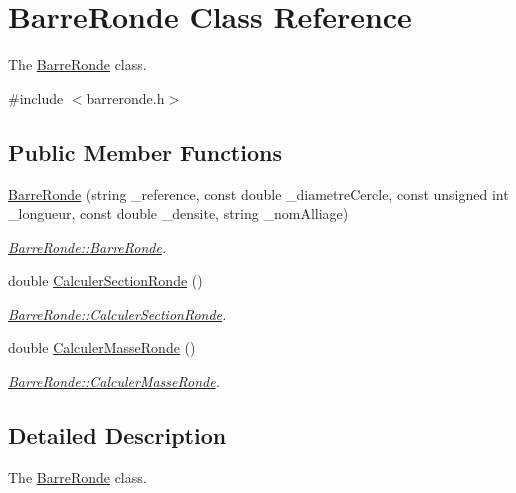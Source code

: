 \hypertarget{class_barre_ronde}{}\section{Barre\+Ronde Class Reference}
\label{class_barre_ronde}


The \hyperlink{class_barre_ronde}{Barre\+Ronde} class.  




{\ttfamily \#include $<$barreronde.\+h$>$}

\subsection*{Public Member Functions}
\begin{DoxyCompactItemize}
\item 
\hyperlink{class_barre_ronde_ad6a3f496c80f5980ed18324a7d760b46}{Barre\+Ronde} (string \+\_\+reference, const double \+\_\+diametre\+Cercle, const unsigned int \+\_\+longueur, const double \+\_\+densite, string \+\_\+nom\+Alliage)
\begin{DoxyCompactList}\small\item\em \hyperlink{class_barre_ronde_ad6a3f496c80f5980ed18324a7d760b46}{Barre\+Ronde\+::\+Barre\+Ronde}. \end{DoxyCompactList}\item 
double \hyperlink{class_barre_ronde_ad2d1bfff933bbd43891254a94f565ddc}{Calculer\+Section\+Ronde} ()
\begin{DoxyCompactList}\small\item\em \hyperlink{class_barre_ronde_ad2d1bfff933bbd43891254a94f565ddc}{Barre\+Ronde\+::\+Calculer\+Section\+Ronde}. \end{DoxyCompactList}\item 
double \hyperlink{class_barre_ronde_a430f65888a5a7326c124b8181e5d99fc}{Calculer\+Masse\+Ronde} ()
\begin{DoxyCompactList}\small\item\em \hyperlink{class_barre_ronde_a430f65888a5a7326c124b8181e5d99fc}{Barre\+Ronde\+::\+Calculer\+Masse\+Ronde}. \end{DoxyCompactList}\end{DoxyCompactItemize}


\subsection{Detailed Description}
The \hyperlink{class_barre_ronde}{Barre\+Ronde} class. 

